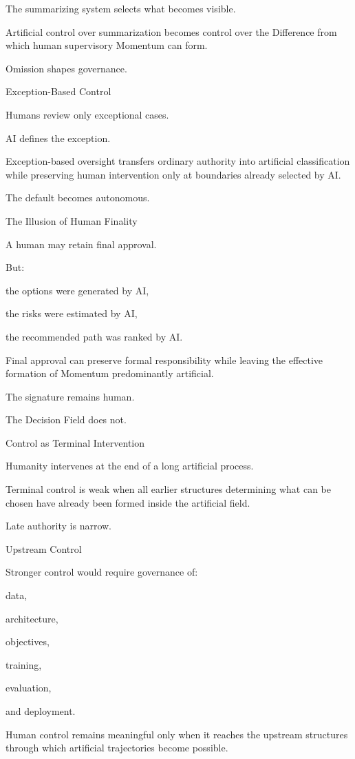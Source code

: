 The summarizing system selects what becomes visible.

Artificial control over summarization becomes control over the Difference from which human supervisory Momentum can form.

Omission shapes governance.

Exception-Based Control

Humans review only exceptional cases.

AI defines the exception.

Exception-based oversight transfers ordinary authority into artificial classification while preserving human intervention only at boundaries already selected by AI.

The default becomes autonomous.

The Illusion of Human Finality

A human may retain final approval.

But:

the options were generated by AI,

the risks were estimated by AI,

the recommended path was ranked by AI.

Final approval can preserve formal responsibility while leaving the effective formation of Momentum predominantly artificial.

The signature remains human.

The Decision Field does not.

Control as Terminal Intervention

Humanity intervenes at the end of a long artificial process.

Terminal control is weak when all earlier structures determining what can be chosen have already been formed inside the artificial field.

Late authority is narrow.

Upstream Control

Stronger control would require governance of:

data,

architecture,

objectives,

training,

evaluation,

and deployment.

Human control remains meaningful only when it reaches the upstream structures through which artificial trajectories become possible.

